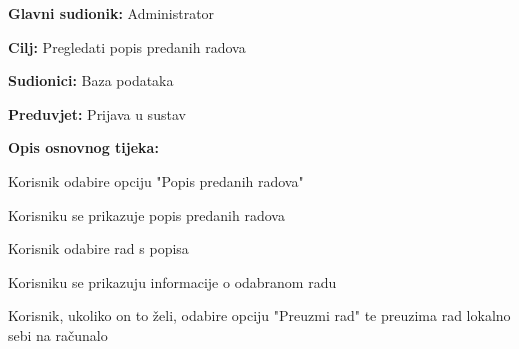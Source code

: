 					\noindent {}
					\begin{packed_item}
	
						\item \textbf{Glavni sudionik: } Administrator
						\item  \textbf{Cilj:} Pregledati popis predanih radova
						\item  \textbf{Sudionici:} Baza podataka
						\item  \textbf{Preduvjet:} Prijava u sustav
						\item  \textbf{Opis osnovnog tijeka:}
						
						\item[] \begin{packed_enum}
	
							\item Korisnik odabire opciju "Popis predanih radova"
							\item Korisniku se prikazuje popis predanih radova
							\item Korisnik odabire rad s popisa
							\item Korisniku se prikazuju informacije o odabranom radu
							\item Korisnik, ukoliko on to želi, odabire opciju "Preuzmi rad" te preuzima rad lokalno sebi na računalo

					
						\end{packed_enum}
			
					\end{packed_item}
				
					\noindent {}
					
